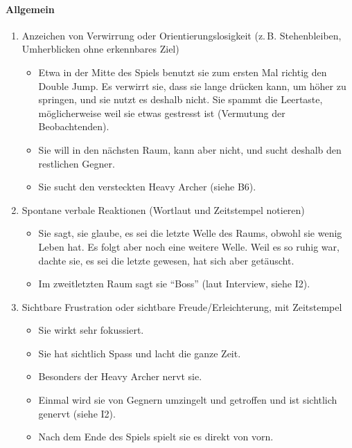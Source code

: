 \documentclass[../Main.tex]{subfiles}
\begin{document}
\paragraph{Allgemein}
\begin{enumerate}[label=\textbf{B\arabic*}, leftmargin=1.5cm, itemsep=0.8em, resume]
\item Anzeichen von Verwirrung oder Orientierungslosigkeit (z.\,B. Stehenbleiben, Umherblicken ohne erkennbares Ziel)
    \begin{itemize}[nosep]
        \item Etwa in der Mitte des Spiels benutzt sie zum ersten Mal richtig den Double Jump. Es verwirrt sie, dass sie lange drücken kann, um höher zu springen, und sie nutzt es deshalb nicht. Sie spammt die Leertaste, möglicherweise weil sie etwas gestresst ist (Vermutung der Beobachtenden).
        \item Sie will in den nächsten Raum, kann aber nicht, und sucht deshalb den restlichen Gegner.
        \item Sie sucht den versteckten Heavy Archer (siehe B6).
    \end{itemize}

\item Spontane verbale Reaktionen (Wortlaut und Zeitstempel notieren)
    \begin{itemize}[nosep]
        \item Sie sagt, sie glaube, es sei die letzte Welle des Raums, obwohl sie wenig Leben hat. Es folgt aber noch eine weitere Welle. Weil es so ruhig war, dachte sie, es sei die letzte gewesen, hat sich aber getäuscht.
        \item Im zweitletzten Raum sagt sie \enquote{Boss} (laut Interview, siehe I2).
    \end{itemize}

\item Sichtbare Frustration oder sichtbare Freude/Erleichterung, mit Zeitstempel
    \begin{itemize}[nosep]
        \item Sie wirkt sehr fokussiert.
        \item Sie hat sichtlich Spass und lacht die ganze Zeit.
        \item Besonders der Heavy Archer nervt sie.
        \item Einmal wird sie von Gegnern umzingelt und getroffen und ist sichtlich genervt (siehe I2).
        \item Nach dem Ende des Spiels spielt sie es direkt von vorn.
    \end{itemize}


\end{enumerate}
\end{document}
